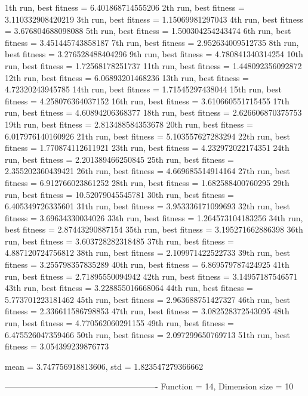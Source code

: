 1th run, best fitness = 6.401868714555206
2th run, best fitness = 3.110332908420219
3th run, best fitness = 1.15069981297043
4th run, best fitness = 3.676804688098088
5th run, best fitness = 1.500304254243474
6th run, best fitness = 3.451445743858187
7th run, best fitness = 2.952634009512735
8th run, best fitness = 3.276528488404296
9th run, best fitness = 4.780841340314254
10th run, best fitness = 1.72568178251737
11th run, best fitness = 1.448092356092872
12th run, best fitness = 6.06893201468236
13th run, best fitness = 4.72320243945785
14th run, best fitness = 1.71545297438044
15th run, best fitness = 4.258076364037152
16th run, best fitness = 3.610660551715455
17th run, best fitness = 4.60894206368377
18th run, best fitness = 2.626606870375753
19th run, best fitness = 2.813488584353678
20th run, best fitness = 6.017976140160926
21th run, best fitness = 5.103557627283294
22th run, best fitness = 1.770874112611921
23th run, best fitness = 4.232972022174351
24th run, best fitness = 2.201389466250845
25th run, best fitness = 2.355202360439421
26th run, best fitness = 4.669685514914164
27th run, best fitness = 6.912766023861252
28th run, best fitness = 1.682588400760295
29th run, best fitness = 10.52079045545781
30th run, best fitness = 6.405349726335601
31th run, best fitness = 3.953336171099693
32th run, best fitness = 3.69634330034026
33th run, best fitness = 1.264573104183256
34th run, best fitness = 2.87443290887154
35th run, best fitness = 3.195271662886398
36th run, best fitness = 3.603728282318485
37th run, best fitness = 4.887120724756812
38th run, best fitness = 2.109971422522733
39th run, best fitness = 3.255798357835289
40th run, best fitness = 6.869579787424925
41th run, best fitness = 2.71895550094942
42th run, best fitness = 3.14957187546571
43th run, best fitness = 3.228855016668064
44th run, best fitness = 5.773701223181462
45th run, best fitness = 2.963688751427327
46th run, best fitness = 2.336611586798853
47th run, best fitness = 3.082528372543095
48th run, best fitness = 4.770562060291155
49th run, best fitness = 6.475526047359466
50th run, best fitness = 2.097299650769713
51th run, best fitness = 3.054399239876773

mean = 3.747756918813606, std = 1.823547279366662

-------------------------------------------------------
Function = 14, Dimension size = 10


